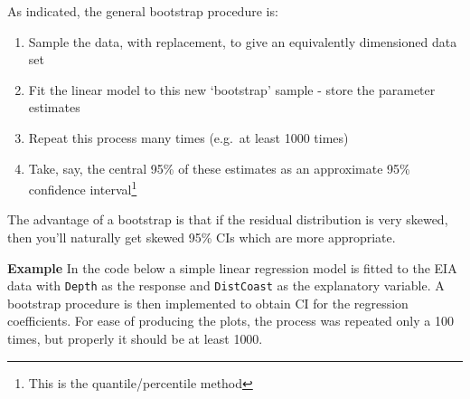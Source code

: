 \documentclass[
  oneside]{krantz}
\providecommand{\tightlist}{%
  \setlength{\itemsep}{0pt}\setlength{\parskip}{0pt}}
\begin{document}
As indicated, the general bootstrap procedure is:

\begin{enumerate}
\def\labelenumi{\arabic{enumi}.}
\tightlist
\item
  Sample the data, with replacement, to give an equivalently dimensioned data set
\item
  Fit the linear model to this new `bootstrap' sample - store the parameter estimates
\item
  Repeat this process many times (e.g.~at least 1000 times)
\item
  Take, say, the central 95\% of these estimates as an approximate 95\% confidence interval\footnote{This is the quantile/percentile method}
\end{enumerate}

The advantage of a bootstrap is that if the residual distribution is very skewed, then you'll naturally get skewed 95\% CIs which are more appropriate.

\textbf{Example} In the code below a simple linear regression model is fitted to the EIA data with \texttt{Depth} as the response and \texttt{DistCoast} as the explanatory variable. A bootstrap procedure is then implemented to obtain CI for the regression coefficients. For ease of producing the plots, the process was repeated only a 100 times, but properly it should be at least 1000.

\small
\end{document}
